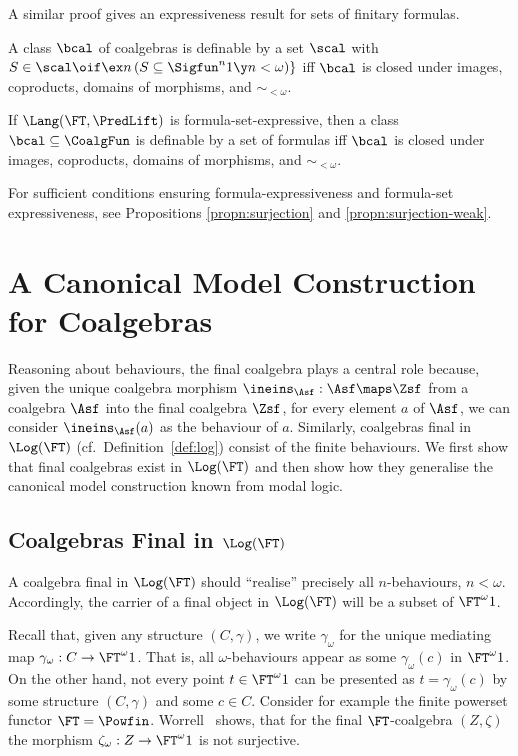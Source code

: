 \documentclass{entcs}
\begin{document}
\noindent
A similar proof gives an expressiveness result for sets of finitary formulas.


\begin{thm}
  A class $\bcal$ of coalgebras is definable by a set $\scal$ with
  $S\in\scal\oif \ex n\, (S\subseteq \Sigfun^n 1 \y n<\omega)\}$ iff $\bcal$ is
  closed under images, coproducts, domains of morphisms, and $\sim_{<\omega}$.
\end{thm}

\begin{cor}
  If $\Lang(\FT,\PredLift)$ is formula-set-expressive, then a class
  $\bcal\subseteq\CoalgFun$ is definable by a set of formulas iff
  $\bcal$ is closed under images, coproducts, domains of morphisms,
  and $\sim_{<\omega}$.
\end{cor}

For sufficient conditions ensuring formula-expressiveness and formula-set expressiveness, see Propositions \ref{propn:surjection} and \ref{propn:surjection-weak}.





\section{A Canonical Model Construction for Coalgebras} \label{section:canonical}

Reasoning about behaviours, the final coalgebra plays a central role
because, given the unique coalgebra morphism
$\ineins_\Asf:\Asf\maps\Zsf$ from a coalgebra $\Asf$ into the final
coalgebra $\Zsf$, for every element $a$ of $\Asf$, we can consider
$\ineins_\Asf(a)$ as the behaviour of $a$. Similarly, coalgebras final
in $\Log(\FT)$ (cf.\ Definition~\ref{def:log}) consist of the finite
behaviours. We first show that final coalgebras exist in $\Log(\FT)$
and then show how they generalise the canonical model construction
known from modal logic.


\subsection{Coalgebras Final in $\Log(\FT)$}

A coalgebra final in $\Log(\FT)$ should ``realise'' precisely all
$n$-behaviours, $n<\omega$. Accordingly, the carrier of a final
object in $\Log(\FT)$ will be a subset of $\FT^\omega 1$.

Recall that, given any structure $(C, \gamma)$, we write
$\gamma_{\omega}$ for the unique mediating map $\gamma_{\omega}: C \to
\FT^{\omega} 1$. That is, all $\omega$-behaviours appear as some
$\gamma_{\omega}(c)$ in $\FT^{\omega} 1$.
%
On the other hand, not every point $t \in \FT^{\omega} 1$ can be
presented as $t = \gamma_{\omega}(c)$ by some structure $(C, \gamma)$
and some $c \in C$.  Consider for example the finite powerset functor
$\FT = \Powfin$.  Worrell~\cite{worrell:cmcs99} shows, that for the
final $\FT$-coalgebra $(Z, \zeta)$ the morphism $\zeta_{\omega}: Z \to
\FT^{\omega} 1$ is not surjective.
\end{document}
